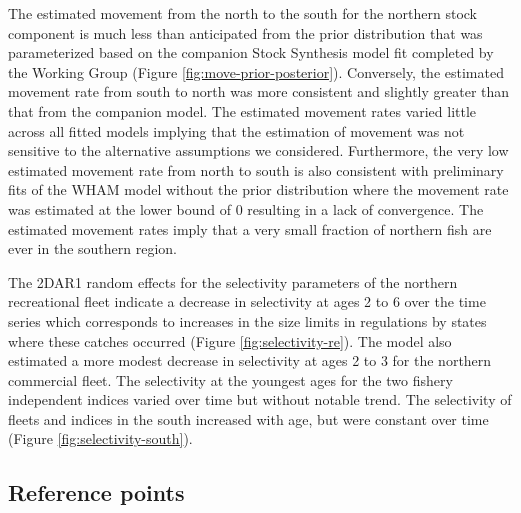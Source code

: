 \documentclass[
]{article}
\begin{document}
The estimated movement from the north to the south for the northern stock component is much less than anticipated from the prior distribution that was parameterized based on the companion Stock Synthesis model fit completed by the Working Group (Figure \ref{fig:move-prior-posterior}). Conversely, the estimated movement rate from south to north was more consistent and slightly greater than that from the companion model. The estimated movement rates varied little across all fitted models implying that the estimation of movement was not sensitive to the alternative assumptions we considered. Furthermore, the very low estimated movement rate from north to south is also consistent with preliminary fits of the WHAM model without the prior distribution where the movement rate was estimated at the lower bound of 0 resulting in a lack of convergence. The estimated movement rates imply that a very small fraction of northern fish are ever in the southern region.

The 2DAR1 random effects for the selectivity parameters of the northern recreational fleet indicate a decrease in selectivity at ages 2 to 6 over the time series which corresponds to increases in the size limits in regulations by states where these catches occurred (Figure \ref{fig:selectivity-re}). The model also estimated a more modest decrease in selectivity at ages 2 to 3 for the northern commercial fleet. The selectivity at the youngest ages for the two fishery independent indices varied over time but without notable trend. The selectivity of fleets and indices in the south increased with age, but were constant over time (Figure \ref{fig:selectivity-south}).

\hypertarget{reference-points-1}{%
\subsection*{Reference points}\label{reference-points-1}}
\end{document}
